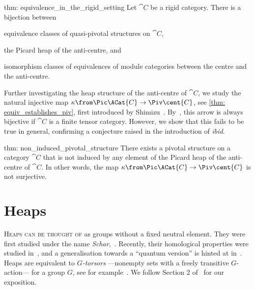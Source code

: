 \newpage%
\begin{reptheorem}{thm: equivalence_in_the_rigid_setting}
  Let \(\cat{C}\) be a rigid category.
  There is a bijection between
  \begin{thmlist}[noitemsep]
    \item equivalence classes of quasi-pivotal structures on \(\cat{C}\),
    \item the Picard heap of the anti\hyp{}centre, and
    \item isomorphism classes of equivalences of module categories between the centre and the anti\hyp{}centre.
  \end{thmlist}
\end{reptheorem}

Further investigating the heap structure of the anti\hyp{}centre of \(\cat{C}\),
we study the natural injective map \(\kappa \from \Pic \ACat{C} \to \Piv \cent{C}\),
see \cref{thm: equiv_establishes_piv},
first introduced by Shimizu~\cite{Shimizu2019:non-degeneracy}.
By~\cite[Theorem~4.1]{shimizu23:pivot-drinf},
this arrow is always bijective if \(\cat{C}\) is a finite tensor category.
However, we show that this fails to be true in general,
confirming a conjecture raised in the introduction of \emph{ibid}.

\begin{reptheorem}{thm: non_induced_pivotal_structure}
  There exists a pivotal structure on a category \(\cat{C}\)
  that is not induced by any element of the Picard heap of the anti\hyp{}centre of \(\cat{C}\).
  In other words,
  the map \(\kappa \from \Pic \ACat{C} \to \Piv \cent{C}\) is not surjective.
\end{reptheorem}

\section{Heaps}\label{sec: heaps}

\textsc{Heaps can be thought of} as groups without a fixed neutral element.
They were first studied under the name \emph{Schar},~\cite{Pruefer1924,baer29:shar}.
Recently, their homological properties were studied in~\cite{Elhamdadi2019},
and a generalisation towards a ``quantum version'' is hinted at in~\cite{Skoda2007}.
Heaps are equivalent to \emph{\(G\)\hyp{}torsors}%
—nonempty sets with a freely transitive \(G\)\hyp{}action—%
for a group \(G\), see for example~\cite{giraud71:cohom}.
We follow Section 2 of~\cite{Brzezinski2020} for our exposition.

